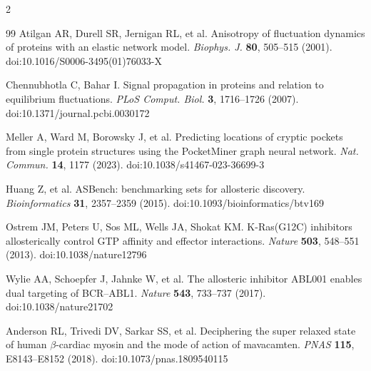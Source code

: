 \documentclass[10pt,a4paper]{article}
\begin{document}
\begin{multicols}{2}
\begin{thebibliography}{99}
 Atilgan AR, Durell SR, Jernigan RL, et al. Anisotropy of fluctuation dynamics
  of proteins with an elastic network model. \textit{Biophys. J.} \textbf{80}, 505--515 (2001).
  doi:10.1016/S0006-3495(01)76033-X

 Chennubhotla C, Bahar I. Signal propagation in proteins and relation to
  equilibrium fluctuations. \textit{PLoS Comput. Biol.} \textbf{3}, 1716--1726 (2007).
  doi:10.1371/journal.pcbi.0030172

 Meller A, Ward M, Borowsky J, et al. Predicting locations of cryptic pockets
  from single protein structures using the PocketMiner graph neural network.
  \textit{Nat. Commun.} \textbf{14}, 1177 (2023). doi:10.1038/s41467-023-36699-3

 Huang Z, et al. ASBench: benchmarking sets for allosteric discovery.
  \textit{Bioinformatics} \textbf{31}, 2357--2359 (2015). doi:10.1093/bioinformatics/btv169

 Ostrem JM, Peters U, Sos ML, Wells JA, Shokat KM. K-Ras(G12C) inhibitors
  allosterically control GTP affinity and effector interactions. \textit{Nature} \textbf{503},
  548--551 (2013). doi:10.1038/nature12796

 Wylie AA, Schoepfer J, Jahnke W, et al. The allosteric inhibitor ABL001 enables
  dual targeting of BCR--ABL1. \textit{Nature} \textbf{543}, 733--737 (2017). doi:10.1038/nature21702

 Anderson RL, Trivedi DV, Sarkar SS, et al. Deciphering the super relaxed state
  of human $\beta$-cardiac myosin and the mode of action of mavacamten. \textit{PNAS} \textbf{115},
  E8143--E8152 (2018). doi:10.1073/pnas.1809540115

\end{thebibliography}
\end{multicols}
\end{document}
